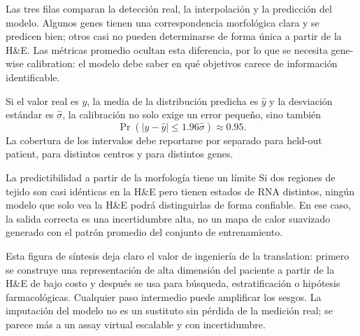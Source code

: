 
Las tres filas comparan la detección real, la interpolación y la predicción del modelo. Algunos genes tienen una correspondencia morfológica clara y se predicen bien; otros casi no pueden determinarse de forma única a partir de la H\&E. Las métricas promedio ocultan esta diferencia, por lo que se necesita gene-wise calibration: el modelo debe saber en qué objetivos carece de información identificable.

Si el valor real es $y$, la media de la distribución predicha es $\hat y$ y la desviación estándar es $\hat\sigma$, la calibración no solo exige un error pequeño, sino también
\[
\Pr\left(|y-\hat y|\leq 1.96\hat\sigma\right)\approx 0.95.
\]
La cobertura de los intervalos debe reportarse por separado para held-out patient, para distintos centros y para distintos genes.

\begin{warningbox}{La predictibilidad a partir de la morfología tiene un límite}
Si dos regiones de tejido son casi idénticas en la H\&E pero tienen estados de RNA distintos, ningún modelo que solo vea la H\&E podrá distinguirlas de forma confiable. En ese caso, la salida correcta es una incertidumbre alta, no un mapa de calor suavizado generado con el patrón promedio del conjunto de entrenamiento.
\end{warningbox}


Esta figura de síntesis deja claro el valor de ingeniería de la translation: primero se construye una representación de alta dimensión del paciente a partir de la H\&E de bajo costo y después se usa para búsqueda, estratificación o hipótesis farmacológicas. Cualquier paso intermedio puede amplificar los sesgos. La imputación del modelo no es un sustituto sin pérdida de la medición real; se parece más a un assay virtual escalable y con incertidumbre.


